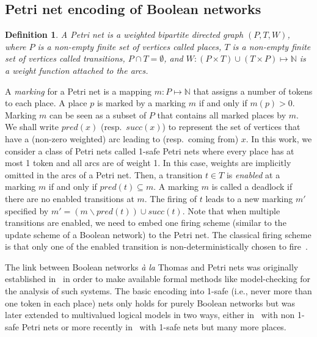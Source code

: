 \documentclass[preprint,12pt]{elsarticle}
\newtheorem{definition}{Definition}[section]
\begin{document}
\subsection{Petri net encoding of Boolean networks}%
\label{sec:encoding}

\begin{definition}

  A \emph{Petri net} is a weighted bipartite directed graph \((P, T, W)\),
  where \(P\) is a non-empty finite set of vertices called \emph{places},
  \(T\) is a non-empty finite set of vertices called \emph{transitions},
  \(P \cap T = \emptyset\),
  and \(W : (P \times T) \cup (T \times P) \mapsto \mathbb{N} \) is a weight function attached to the arcs.

\end{definition}
A \emph{marking} for a Petri net is a mapping \(m : P \mapsto \mathbb{N}\) that assigns a number of tokens to each place. 
A place \(p\) is marked by a marking \(m\) if and only if \(m(p) > 0\). 
Marking \(m\) can be seen as a subset of \(P\) that contains all marked places by \(m\).
We shall write \(pred(x)\) (resp.\ \(succ(x)\)) to represent the set of vertices that have a (non-zero weighted) arc leading to (resp.\ coming from) \(x\).
In this work, we consider a class of Petri nets called 1-safe Petri nets where every place has at most 1 token and all arcs are of weight 1.
In this case, weights are implicitly omitted in the arcs of a Petri net.
Then, a transition \(t \in T\) is \emph{enabled} at a marking \(m\) if and only if \(pred(t) \subseteq m\). 
A marking \(m\) is called a deadlock if there are no enabled transitions at \(m\).
The firing of \(t\) leads to a new marking \(m'\) specified by \(m' = (m \backslash pred(t)) \cup succ(t)\).
Note that when multiple transitions are enabled, we need to embed one firing scheme (similar to the update scheme of a Boolean network) to the Petri net.
The classical firing scheme is that only one of the enabled transition is non-deterministically chosen to fire~\cite{Murata1989}.

The link between Boolean networks \emph{à la} Thomas and Petri nets was originally established in~\cite{chaouiya2004qualitative} in order to make available formal methods like model-checking for the analysis of such systems.
The basic encoding into 1-safe (i.e., never more than one token in each place) nets only holds for purely Boolean networks but was later extended to multivalued logical models in two ways, either in~\cite{chaouiya2011petri} with non 1-safe Petri nets or more recently in~\cite{chatain2014characterization} with 1-safe nets but many more places.
\end{document}

